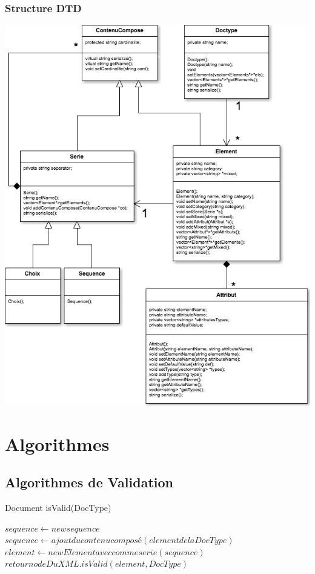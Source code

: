 \subsubsection{Structure DTD}
\medskip
\begin {center}
\includegraphics[width=\textwidth]{UMLDTD.png}
\end {center}
\medskip


\section{Algorithmes}

\subsection{Algorithmes de Validation}

\begin{algorithm}
\caption{Document isValid(DocType)}
\begin{algorithmic}
\STATE $sequence \leftarrow new sequence$
\STATE $sequence \leftarrow ajout du contenu composé (element de la DocType)$
\ENDFOR
\STATE $element \leftarrow new Element avec comme serie(sequence)$
\STATE $retour nodeDuXML.isValid(element,DocType)$
\end{algorithmic}
\end{algorithm}

